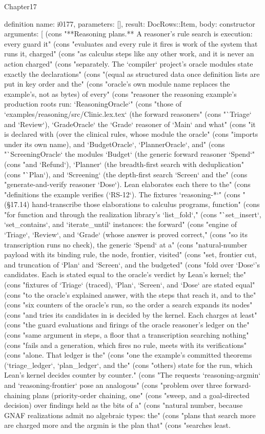 \begin{lexlean}{Chapter17}
\begin{semanticmodule}
definition{
  name: i0177,
  parameters: [],
  result: DocRows::Item,
  body: constructor{
    arguments: [
      (cons "**Reasoning plans.** A reasoner's rule search is execution: every guard it" (cons "evaluates and every rule it fires is work of the system that runs it, charged" (cons "as calculus steps like any other work, and it is never an action charged" (cons "separately. The `compiler` project's oracle modules state exactly the declarations" (cons "(equal as structured data once definition lists are put in key order and the" (cons "oracle's own module name replaces the example's, not as bytes) of every" (cons "reasoner the reasoning example's production roots run: `ReasoningOracle`" (cons "those of `examples/reasoning/src/Clinic.lex.tex` (the forward reasoners" (cons "`Triage` and `Review`), `GradeOracle` the `Grade` reasoner of `Main` and what" (cons "it is declared with (over the clinical rules, whose module the oracle" (cons "imports under its own name), and `BudgetOracle`, `PlannerOracle`, and" (cons "`ScreeningOracle` the modules `Budget` (the generic forward reasoner `Spend`" (cons "and `Refund`), `Planner` (the breadth-first search with deduplication" (cons "`Plan`), and `Screening` (the depth-first search `Screen` and the" (cons "generate-and-verify reasoner `Dose`). Lean elaborates each there to the" (cons "definitions the example verifies (`RS-12`). The fixtures `reasoning-*`" (cons "(§17.14) hand-transcribe those elaborations to calculus programs, function" (cons "for function and through the realization library's `list_fold`," (cons "`set_insert`, `set_contains`, and `iterate_until` instances: the forward" (cons "engine of `Triage`, `Review`, and `Grade` (whose answer is proved correct," (cons "so its transcription runs no check), the generic `Spend` at a" (cons "natural-number payload with its binding rule, the node, frontier, visited" (cons "set, frontier cut, and truncation of `Plan` and `Screen`, and the budgeted" (cons "fold over `Dose`'s candidates. Each is stated equal to the oracle's verdict by Lean's kernel; the" (cons "fixtures of `Triage` (traced), `Plan`, `Screen`, and `Dose` are stated equal" (cons "to the oracle's explained answer, with the steps that reach it, and to the" (cons "six counters of the oracle's run, so the order a search expands its nodes" (cons "and tries its candidates in is decided by the kernel. Each charges at least" (cons "the guard evaluations and firings of the oracle reasoner's ledger on the" (cons "same argument in steps, a floor that a transcription searching nothing" (cons "fails and a generation, which fires no rule, meets with its verifications" (cons "alone. That ledger is the" (cons "one the example's committed theorems (`triage_ledger`, `plan_ledger`, and the" (cons "others) state for the run, which Lean's kernel decides counter by counter." (cons "The requests `reasoning-argmin` and `reasoning-frontier` pose an analogous" (cons "problem over three forward-chaining plans (priority-order chaining, one" (cons "sweep, and a goal-directed decision) over findings held as the bits of a" (cons "natural number, because GNAF realizations admit no algebraic types: the" (cons "plans that search more are charged more and the argmin is the plan that" (cons "searches least. }}
\end{semanticmodule}
\end{lexlean}
